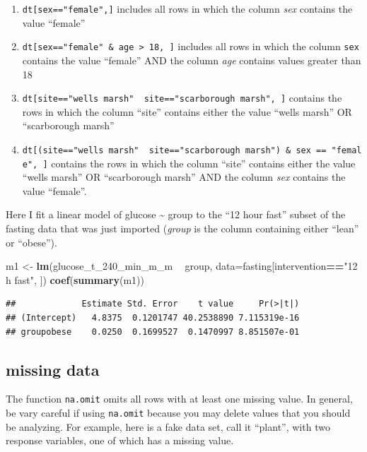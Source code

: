 \documentclass[]{book}
\newenvironment{Shaded}{\begin{snugshade}}{\end{snugshade}}
\newcommand{\KeywordTok}[1]{\textcolor[rgb]{0.13,0.29,0.53}{\textbf{#1}}}
\newcommand{\DataTypeTok}[1]{\textcolor[rgb]{0.13,0.29,0.53}{#1}}
\newcommand{\StringTok}[1]{\textcolor[rgb]{0.31,0.60,0.02}{#1}}
\newcommand{\OperatorTok}[1]{\textcolor[rgb]{0.81,0.36,0.00}{\textbf{#1}}}
\newcommand{\NormalTok}[1]{#1}
\providecommand{\tightlist}{%
  \setlength{\itemsep}{0pt}\setlength{\parskip}{0pt}}
\begin{document}
\begin{enumerate}
\def\labelenumi{\arabic{enumi}.}
\tightlist
\item
  \texttt{dt{[}sex=="female",{]}} includes all rows in which the column
  \emph{sex} contains the value ``female''
\item
  \texttt{dt{[}sex=="female"\ \&\ age\ \textgreater{}\ 18,\ {]}}
  includes all rows in which the column \texttt{sex} contains the value
  ``female'' AND the column \emph{age} contains values greater than 18
\item
  \texttt{dt{[}site=="wells\ marsh"\ \textbar{}\ site=="scarborough\ marsh",\ {]}}
  contains the rows in which the column ``site'' contains either the
  value ``wells marsh'' OR ``scarborough marsh''
\item
  \texttt{dt{[}(site=="wells\ marsh"\ \textbar{}\ site=="scarborough\ marsh")\ \&\ sex\ ==\ "female",\ {]}}
  contains the rows in which the column ``site'' contains either the
  value ``wells marsh'' OR ``scarborough marsh'' AND the column
  \emph{sex} contains the value ``female''.
\end{enumerate}

Here I fit a linear model of glucose \textasciitilde{} group to the ``12
hour fast'' subset of the fasting data that was just imported
(\emph{group} is the column containing either ``lean'' or ``obese'').

\begin{Shaded}
\begin{Highlighting}[]
\NormalTok{m1 <-}\StringTok{ }\KeywordTok{lm}\NormalTok{(glucose_t_240_min_m_m }\OperatorTok{~}\StringTok{ }\NormalTok{group, }\DataTypeTok{data=}\NormalTok{fasting[intervention}\OperatorTok{==}\StringTok{"12 h fast"}\NormalTok{, ])}
\KeywordTok{coef}\NormalTok{(}\KeywordTok{summary}\NormalTok{(m1))}
\end{Highlighting}
\end{Shaded}

\begin{verbatim}
##             Estimate Std. Error    t value     Pr(>|t|)
## (Intercept)   4.8375  0.1201747 40.2538890 7.115319e-16
## groupobese    0.0250  0.1699527  0.1470997 8.851507e-01
\end{verbatim}

\subsection{missing data}\label{missing-data}

The function \texttt{na.omit} omits all rows with at least one missing
value. In general, be vary careful if using \texttt{na.omit} because you
may delete values that you should be analyzing. For example, here is a
fake data set, call it ``plant'', with two response variables, one of
which has a missing value.
\end{document}
